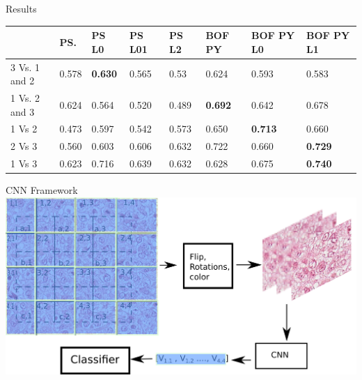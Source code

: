 \documentclass[usenames,dvipsnames]{beamer}
\begin{document}
\begin{frame}{Results}

\begin{table}[l]
\begin{tabular}{|m{1.2cm}|m{1cm}|m{1cm}|m{1cm}|m{1cm}||m{1cm}|m{1cm}|m{1cm}|}
\hline
              & PS.  & PS L0   & PS L01 & PS L2 & BOF PY          & BOF PY L0       & BOF PY L1\\ \hline
3 Vs. 1 and 2 & 0.578     & \textbf{0.630} & 0.565        & 0.53         & 0.624          & 0.593           & 0.583\\ \hline
1 Vs. 2 and 3 & 0.624    & 0.564          & 0.520         & 0.489        & \textbf{0.692} & 0.642           & 0.678\\ \hline
1 Vs 2        & 0.473     & 0.597          & 0.542         & 0.573        & 0.650           & \textbf{0.713} & 0.660\\ \hline
2 Vs 3        & 0.560     & 0.603          & 0.606         & 0.632        & 0.722          & 0.660           & \textbf{0.729}\\ \hline
1 Vs 3        & 0.623     & 0.716          & 0.639         & 0.632       & 0.628          & 0.675         & \textbf{0.740} \\ \hline
\end{tabular}
\end{table}
    
\end{frame}



\begin{frame}{CNN Framework}
    \centering
   \includegraphics[width=1\textwidth]{imagenes_cnn/CCn_methodFS2.png}
\end{frame}
\end{document}
